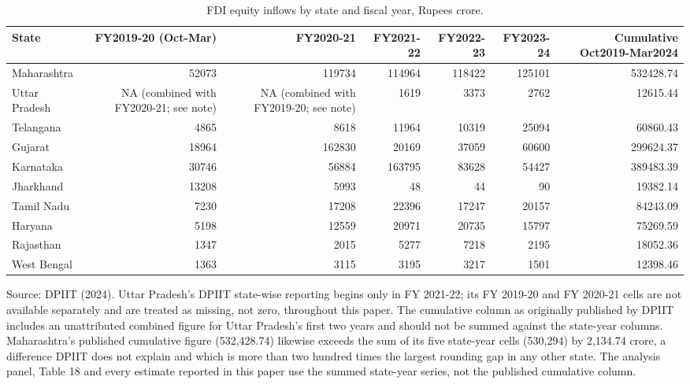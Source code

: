\documentclass[12pt,a4paper]{article}
\begin{document}
\begin{table}[H]
\centering
\caption{FDI equity inflows by state and fiscal year, Rupees crore.}
\label{tab:11}
\footnotesize
\begin{adjustbox}{max width=\textwidth}
\begin{tabular}{@{}lrrrrrr@{}}
\toprule
State & FY2019-20 (Oct-Mar) & FY2020-21 & FY2021-22 & FY2022-23 & FY2023-24 & Cumulative Oct2019-Mar2024 \\
\midrule
Maharashtra & 52073 & 119734 & 114964 & 118422 & 125101 & 532428.74 \\
Uttar Pradesh & NA (combined with FY2020-21; see note) & NA (combined with FY2019-20; see note) & 1619 & 3373 & 2762 & 12615.44 \\
Telangana & 4865 & 8618 & 11964 & 10319 & 25094 & 60860.43 \\
Gujarat & 18964 & 162830 & 20169 & 37059 & 60600 & 299624.37 \\
Karnataka & 30746 & 56884 & 163795 & 83628 & 54427 & 389483.39 \\
Jharkhand & 13208 & 5993 & 48 & 44 & 90 & 19382.14 \\
Tamil Nadu & 7230 & 17208 & 22396 & 17247 & 20157 & 84243.09 \\
Haryana & 5198 & 12559 & 20971 & 20735 & 15797 & 75269.59 \\
Rajasthan & 1347 & 2015 & 5277 & 7218 & 2195 & 18052.36 \\
West Bengal & 1363 & 3115 & 3195 & 3217 & 1501 & 12398.46 \\
\bottomrule
\end{tabular}
\end{adjustbox}
\end{table}

Source: DPIIT (2024). Uttar Pradesh's DPIIT state-wise reporting begins only in FY 2021-22; its FY 2019-20 and FY 2020-21 cells are not available separately and are treated as missing, not zero, throughout this paper. The cumulative column as originally published by DPIIT includes an unattributed combined figure for Uttar Pradesh's first two years and should not be summed against the state-year columns. Maharashtra's published cumulative figure (532,428.74) likewise exceeds the sum of its five state-year cells (530,294) by 2,134.74 crore, a difference DPIIT does not explain and which is more than two hundred times the largest rounding gap in any other state. The analysis panel, Table 18 and every estimate reported in this paper use the summed state-year series, not the published cumulative column.
\end{document}
